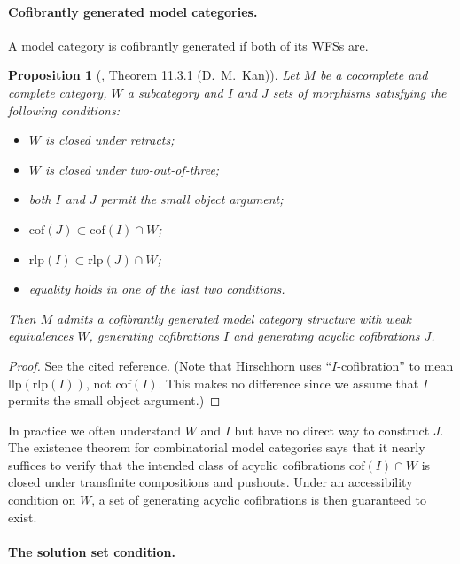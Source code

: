 \documentclass{article}
\theoremstyle{definition}
\theoremstyle{plain}
\newtheorem{prop}[definition]{Proposition}
\newcommand{\cof}{\mathrm{cof}}
\newcommand{\llp}{\mathrm{llp}}
\newcommand{\rlp}{\mathrm{rlp}}
\begin{document}
\paragraph{Cofibrantly generated model categories.}
A model category is cofibrantly generated if both of its WFSs are.

\begin{prop}[\cite{H}, Theorem 11.3.1 (D.\ M.\ Kan)]
  Let $M$ be a cocomplete and complete category, $W$ a subcategory and $I$ and $J$ sets of morphisms satisfying the following conditions:
  \begin{itemize}
  \item $W$ is closed under retracts;
  \item $W$ is closed under two-out-of-three;
  \item both $I$ and $J$ permit the small object argument;
  \item $\cof(J) \subset \cof(I) \cap W$;
  \item $\rlp(I) \subset \rlp(J) \cap W$;
  \item equality holds in one of the last two conditions.
  \end{itemize}
  Then $M$ admits a cofibrantly generated model category structure with weak equivalences $W$, generating cofibrations $I$ and generating acyclic cofibrations $J$.
\end{prop}

\begin{proof}
  See the cited reference.
  (Note that Hirschhorn uses ``$I$-cofibration'' to mean $\llp(\rlp(I))$, not $\cof(I)$.
  This makes no difference since we assume that $I$ permits the small object argument.)
\end{proof}

In practice we often understand $W$ and $I$ but have no direct way to construct $J$.
The existence theorem for combinatorial model categories says that it nearly suffices to verify that the intended class of acyclic cofibrations $\cof(I) \cap W$ is closed under transfinite compositions and pushouts.
Under an accessibility condition on $W$, a set of generating acyclic cofibrations is then guaranteed to exist.

\paragraph{The solution set condition.}
\end{document}
